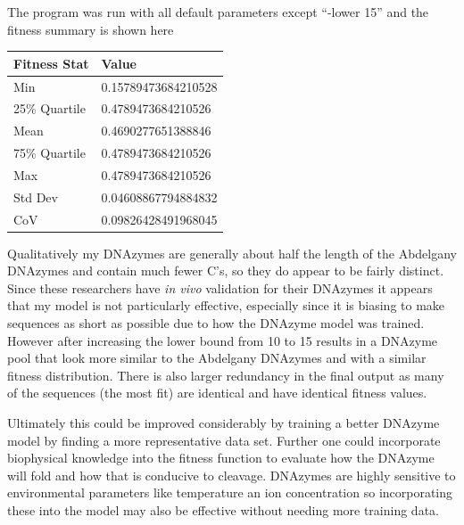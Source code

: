 \documentclass[11pt]{article}
\begin{document}
The program was run with all default parameters except ``-lower 15'' and the fitness summary is shown here
\begin{center}
    \begin{tabular}{l|l}
        Fitness Stat & Value \\
        \hline
        Min             &0.15789473684210528\\
        25\% Quartile   &0.4789473684210526\\
        Mean            &0.4690277651388846\\
        75\% Quartile   &0.4789473684210526\\
        Max             &0.4789473684210526\\
        Std Dev         &0.04608867794884832\\
        CoV             &0.09826428491968045\\
    \end{tabular}
\end{center}
Qualitatively my DNAzymes are generally about half the length of the Abdelgany DNAzymes and contain much fewer C's, so they do appear to be fairly distinct.
Since these researchers have \textit{in vivo} validation for their DNAzymes it appears that my model is not particularly effective, especially since it is biasing to make sequences as short as possible due to how the DNAzyme model was trained.
However after increasing the lower bound from 10 to 15 results in a DNAzyme pool that look more similar to the Abdelgany DNAzymes and with a similar fitness distribution.
There is also larger redundancy in the final output as many of the sequences (the most fit) are identical and have identical fitness values.
\par
Ultimately this could be improved considerably by training a better DNAzyme model by finding a more representative data set.
Further one could incorporate biophysical knowledge into the fitness function to evaluate how the DNAzyme will fold and how that is conducive to cleavage.
DNAzymes are highly sensitive to environmental parameters like temperature an ion concentration so incorporating these into the model may also be effective without needing more training data.
\printbibliography
\end{document}
